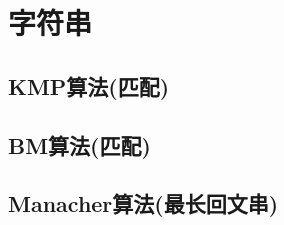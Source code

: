 \section{字符串}
\subsection{KMP算法(匹配)}


\subsection{BM算法(匹配)}


\subsection{Manacher算法(最长回文串)}


%
%
%
%